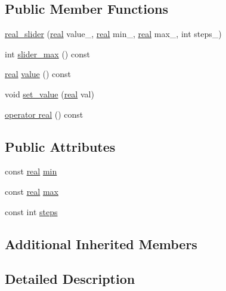\subsection*{Public Member Functions}
\begin{DoxyCompactItemize}
\item 
\hyperlink{classtlz_1_1viewer_1_1real__slider_a0d4dacf0dadd3fada9ff598f274a9004}{real\+\_\+slider} (\hyperlink{namespacetlz_a15fd37cce97f2b8b606af18c2615f602}{real} value\+\_\+, \hyperlink{namespacetlz_a15fd37cce97f2b8b606af18c2615f602}{real} min\+\_\+, \hyperlink{namespacetlz_a15fd37cce97f2b8b606af18c2615f602}{real} max\+\_\+, int steps\+\_\+)
\item 
int \hyperlink{classtlz_1_1viewer_1_1real__slider_ada699141fe60f7c4455cc32fcecbfe7d}{slider\+\_\+max} () const 
\item 
\hyperlink{namespacetlz_a15fd37cce97f2b8b606af18c2615f602}{real} \hyperlink{classtlz_1_1viewer_1_1real__slider_afc68e8dd902349e26e697fcc94d441c4}{value} () const 
\item 
void \hyperlink{classtlz_1_1viewer_1_1real__slider_a383a67e68bf161720403ebf01421cf58}{set\+\_\+value} (\hyperlink{namespacetlz_a15fd37cce97f2b8b606af18c2615f602}{real} val)
\item 
\hyperlink{classtlz_1_1viewer_1_1real__slider_ab67f2ca14ff3e1c0476bdd0071ef459b}{operator real} () const 
\end{DoxyCompactItemize}
\subsection*{Public Attributes}
\begin{DoxyCompactItemize}
\item 
const \hyperlink{namespacetlz_a15fd37cce97f2b8b606af18c2615f602}{real} \hyperlink{classtlz_1_1viewer_1_1real__slider_a62ed7a6f85b5b5eb3bfcf39f427a52c8}{min}
\item 
const \hyperlink{namespacetlz_a15fd37cce97f2b8b606af18c2615f602}{real} \hyperlink{classtlz_1_1viewer_1_1real__slider_aeea8984e29061a13bd5416a03890488b}{max}
\item 
const int \hyperlink{classtlz_1_1viewer_1_1real__slider_a8f182f96542ca63e12a0628c86aa6a72}{steps}
\end{DoxyCompactItemize}
\subsection*{Additional Inherited Members}


\subsection{Detailed Description}


